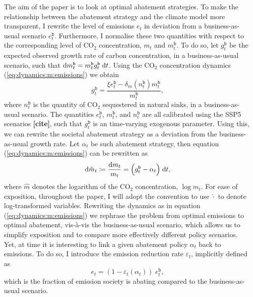 \documentclass[../../main.tex]{subfiles}
\begin{document}
The aim of the paper is to look at optimal abatement strategies. To make the relationship between the abatement strategy and the climate model more transparent, I rewrite the level of emissions $e_t$ in deviation from a business-as-usual scenario $e^{\mathtt{b}}_t$. Furthermore, I normalise these two quantities with respect to the corresponding level of CO$_2$ concentration, $m_t$ and $m^{\mathtt{b}}_t$. To do so, let $g^{\mathtt{b}}_t$ be the expected observed growth rate of carbon concentration, in a business-as-usual scenario, such that $\mathrm{d}m^{\mathtt{b}}_t = m^{\mathtt{b}}_t g^{\mathtt{b}}_t \; \mathrm{d}t$. Using the CO$_2$ concentration dynamics (\ref{eq:dynamics:m:emissions}) we obtain \begin{equation} \label{eq:growth-rate-bau}
    g^{\mathtt{b}}_t = \frac{\xi e^{\mathtt{b}}_t - \delta_m(n^{\mathtt{b}}_t) m^{\mathtt{b}}_t}{m^{\mathtt{b}}_t},
\end{equation} where $n^{\mathtt{b}}_t$ is the quantity of CO$_2$ sequestered in natural sinks, in a business-as-usual scenario. The quantities $e^{\mathtt{b}}_t$, $m^{\mathtt{b}}_t$, and $n^{\mathtt{b}}_t$ are all calibrated using the SSP5 scenarios \textbf{[cite]}, such that $g^{\mathtt{b}}_t$ is an time-varying exogenous parameter. Using this, we can rewrite the societal abatement strategy as a deviation from the business-as-usual growth rate. Let $\alpha_t$ be such abatement strategy, then equation (\ref{eq:dynamics:m:emissions}) can be rewritten as \begin{equation} \label{eq:dynamics:m:abatement}
    \mathrm{d}\hat m_t \coloneqq \frac{\mathrm{d}m_t}{m_t} = \Big( g^{\mathtt{b}}_t - \alpha_t \Big)\; \mathrm{d}t,
\end{equation} where $\hat m$ denotes the logarithm of the CO$_2$ concentration, $\log m_t$. For ease of exposition, throughout the paper, I will adopt the convention to use $\hat \cdot$ to denote log-transformed variables. Rewriting the dynamics as in equation (\ref{eq:dynamics:m:emissions}) we rephrase the problem from optimal emissions to optimal abatement, vis-à-vis the business-as-usual scenario, which allows us to simplify exposition and to compare more effectively different policy scenarios. Yet, at time it is interesting to link a given abatement policy $\alpha_t$ back to emissions. To do so, I introduce the emission reduction rate $\varepsilon_t$, implicitly defined as \begin{equation} \label{eq:emission-reduction-rate}
    e_t = (1 - \varepsilon_t(\alpha_t)) \; e^{\mathtt{b}}_t,
\end{equation} which is the fraction of emission society is abating compared to the business-as-usual scenario.
\end{document}
